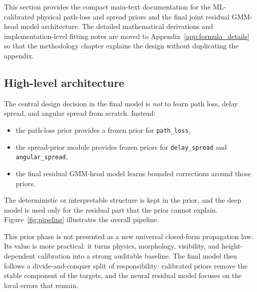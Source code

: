 This section provides the compact main-text documentation for the
ML-calibrated physical path-loss and spread priors and the final joint
residual GMM-head model architecture. The detailed mathematical derivations and
implementation-level fitting notes are moved to Appendix~\ref{app:formula_details}
so that the methodology chapter explains the design without duplicating the
appendix.

\subsection{High-level architecture}

The central design decision in the final model is \emph{not} to learn path
loss, delay spread, and angular spread from scratch. Instead:

\begin{itemize}
\item the path-loss prior provides a frozen prior for \texttt{path\_loss},
\item the spread-prior module provides frozen priors for \texttt{delay\_spread} and
      \texttt{angular\_spread},
\item the final residual GMM-head model learns bounded corrections around those priors.
\end{itemize}

The deterministic or interpretable structure is kept in the prior, and the deep
model is used only for the residual part that the prior cannot explain.
Figure~\ref{fig:pipeline} illustrates the overall pipeline.

This prior phase is not presented as a new universal closed-form propagation
law. Its value is more practical: it turns physics, morphology, visibility, and
height-dependent calibration into a strong auditable baseline. The final model
then follows a divide-and-conquer split of responsibility: calibrated priors
remove the stable component of the targets, and the neural residual model
focuses on the local errors that remain.


